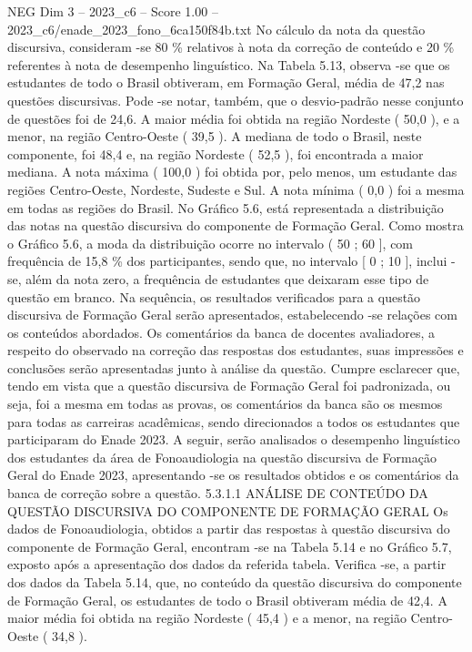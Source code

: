 \begin{textsample}{NEG Dim 3 – 2023\_c6 – Score 1.00 – 2023\_c6/enade\_2023\_fono\_6ca150f84b.txt}
No cálculo da nota da questão discursiva, consideram -se 80 \% relativos à nota da correção de conteúdo e 20 \% referentes à nota de desempenho linguístico.
Na Tabela 5.13, observa -se que os estudantes de todo o Brasil obtiveram, em Formação Geral, média de 47,2 nas questões discursivas.
Pode -se notar, também, que o desvio-padrão nesse conjunto de questões foi de 24,6.
A maior média foi obtida na região Nordeste ( 50,0 ), e a menor, na região Centro-Oeste ( 39,5 ).
A mediana de todo o Brasil, neste componente, foi 48,4 e, na região Nordeste ( 52,5 ), foi encontrada a maior mediana.
A nota máxima ( 100,0 ) foi obtida por, pelo menos, um estudante das regiões Centro-Oeste, Nordeste, Sudeste e Sul.
A nota mínima ( 0,0 ) foi a mesma em todas as regiões do Brasil.
No Gráfico 5.6, está representada a distribuição das notas na questão discursiva do componente de Formação Geral.
Como mostra o Gráfico 5.6, a moda da distribuição ocorre no intervalo ( 50 ; 60 ], com frequência de 15,8 \% dos participantes, sendo que, no intervalo [ 0 ; 10 ], inclui -se, além da nota zero, a frequência de estudantes que deixaram esse tipo de questão em branco.
Na sequência, os resultados verificados para a questão discursiva de Formação Geral serão apresentados, estabelecendo -se relações com os conteúdos abordados.
Os comentários da banca de docentes avaliadores, a respeito do observado na correção das respostas dos estudantes, suas impressões e conclusões serão apresentadas junto à análise da questão.
Cumpre esclarecer que, tendo em vista que a questão discursiva de Formação Geral foi padronizada, ou seja, foi a mesma em todas as provas, os comentários da banca são os mesmos para todas as carreiras acadêmicas, sendo direcionados a todos os estudantes que participaram do Enade 2023.
A seguir, serão analisados o desempenho linguístico dos estudantes da área de Fonoaudiologia na questão discursiva de Formação Geral do Enade 2023, apresentando -se os resultados obtidos e os comentários da banca de correção sobre a questão. 5.3.1.1 ANÁLISE DE CONTEÚDO DA QUESTÃO DISCURSIVA DO COMPONENTE DE FORMAÇÃO GERAL Os dados de Fonoaudiologia, obtidos a partir das respostas à questão discursiva do componente de Formação Geral, encontram -se na Tabela 5.14 e no Gráfico 5.7, exposto após a apresentação dos dados da referida tabela.
Verifica -se, a partir dos dados da Tabela 5.14, que, no conteúdo da questão discursiva do componente de Formação Geral, os estudantes de todo o Brasil obtiveram média de 42,4.
A maior média foi obtida na região Nordeste ( 45,4 ) e a menor, na região Centro-Oeste ( 34,8 ).

\end{textsample}
